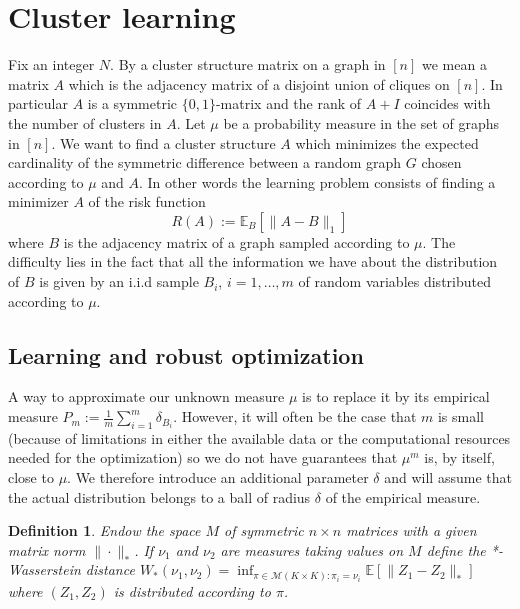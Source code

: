 \documentclass[12pt]{amsart}
\newtheorem{definition}{Definition}
\numberwithin{equation}{section}
\newcommand{\EE}{\mathbb{E}}
\begin{document}
\section{Cluster learning}
Fix an integer $N$. By a cluster structure matrix on a graph in $[n]$ we mean a matrix $A$ which is the adjacency matrix of a disjoint union of cliques on $[n]$. In particular $A$ is a symmetric $\{0,1\}$-matrix and the rank of $A+I$ coincides with the number of clusters in $A$. Let $\mu$ be a probability measure in the set of graphs in $[n]$. We want to find a cluster structure $A$ which minimizes the expected cardinality of the symmetric difference between a random graph $G$ chosen according to $\mu$ and $A$. In other words the learning problem consists of finding a minimizer $A$ of the risk function
\[R(A):=\EE_B[\|A-B\|_1]\] 
where $B$ is the adjacency matrix of a graph sampled according to $\mu$.
The difficulty lies in the fact that all the information we have about the distribution of $B$ is given by an i.i.d sample $B_i$, $i=1,\dots,m$ of random variables distributed according to $\mu$.


\subsection{Learning and robust optimization}

A way to approximate our unknown measure $\mu$ is to replace it by its empirical measure $P_m:=\frac{1}{m}\sum_{i=1}^m\delta_{B_i}$. However, it will often be the case that $m$ is small (because of limitations in either the available data or the computational resources needed for the optimization) so we do not have guarantees that $\mu^{m}$ is, by itself, close to $\mu$. We therefore introduce an additional parameter $\delta$ and will assume that the actual distribution belongs to a ball of radius $\delta$ of the empirical measure.

\begin{definition} Endow the space $M$ of symmetric $n\times n$ matrices with a given matrix norm $\|\cdot\|_*$. If $\nu_1$ and $\nu_2$ are measures taking values on $M$ define the *-Wasserstein distance $W_*(\nu_1,\nu_2)=\inf_{\pi\in\mathcal{M}(K\times K):\pi_i=\nu_i}\EE[\|Z_1-Z_2\|_*]$ where $(Z_1,Z_2)$ is distributed according to $\pi$.
\end{definition}
\end{document}
